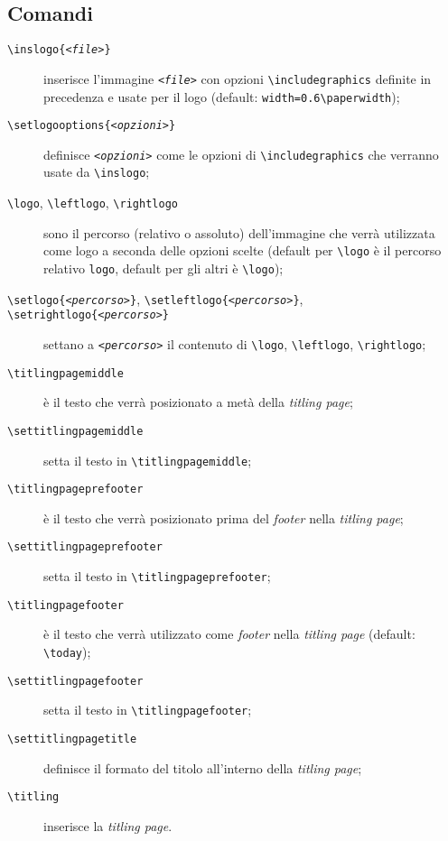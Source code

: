 \documentclass[a4paper,oneside,centered,noparindent,noparskip]{bookest}
\begin{document}
\subsection{Comandi}
\begin{description}
 \item[\texttt{\textbackslash inslogo\{\textit{<file>}\}}] inserisce l'immagine \texttt{\textit{<file>}} con opzioni \texttt{\textbackslash includegraphics} definite in precedenza e usate per il logo (default: \texttt{width=0.6\textbackslash paperwidth});
 \item[\texttt{\textbackslash setlogooptions\{\textit{<opzioni>}\}}] definisce \texttt{\textit{<opzioni>}} come le opzioni di \texttt{\textbackslash includegraphics} che verranno usate da \texttt{\textbackslash inslogo};
 \item[\texttt{\textbackslash logo}, \texttt{\textbackslash leftlogo}, \texttt{\textbackslash rightlogo}] sono il percorso (relativo o assoluto) dell'immagine che verrà utilizzata come logo a seconda delle opzioni scelte (default per \texttt{\textbackslash logo} è il percorso relativo \texttt{logo}, default per gli altri è \texttt{\textbackslash logo});
 \item[\texttt{\textbackslash setlogo\{\textit{<percorso>}\}}, \texttt{\textbackslash setleftlogo\{\textit{<percorso>}\}}, \texttt{\textbackslash setrightlogo\{\textit{<percorso>}\}}] settano a \texttt{\textit{<percorso>}} il contenuto di \texttt{\textbackslash logo}, \texttt{\textbackslash leftlogo}, \texttt{\textbackslash rightlogo};
 \item[\texttt{\textbackslash titlingpagemiddle}] è il testo che verrà posizionato a metà della \emph{titling page};
 \item[\texttt{\textbackslash settitlingpagemiddle}] setta il testo in \texttt{\textbackslash titlingpagemiddle};
 \item[\texttt{\textbackslash titlingpageprefooter}] è il testo che verrà posizionato prima del \emph{footer} nella \emph{titling page};
 \item[\texttt{\textbackslash settitlingpageprefooter}] setta il testo in \texttt{\textbackslash titlingpageprefooter};
 \item[\texttt{\textbackslash titlingpagefooter}] è il testo che verrà utilizzato come \emph{footer} nella \emph{titling page} (default: \texttt{\textbackslash today});
 \item[\texttt{\textbackslash settitlingpagefooter}] setta il testo in \texttt{\textbackslash titlingpagefooter};
 \item[\texttt{\textbackslash settitlingpagetitle}] definisce il formato del titolo all'interno della \emph{titling page};
 \item[\texttt{\textbackslash titling}] inserisce la \emph{titling page}.
\end{description}
\end{document}
